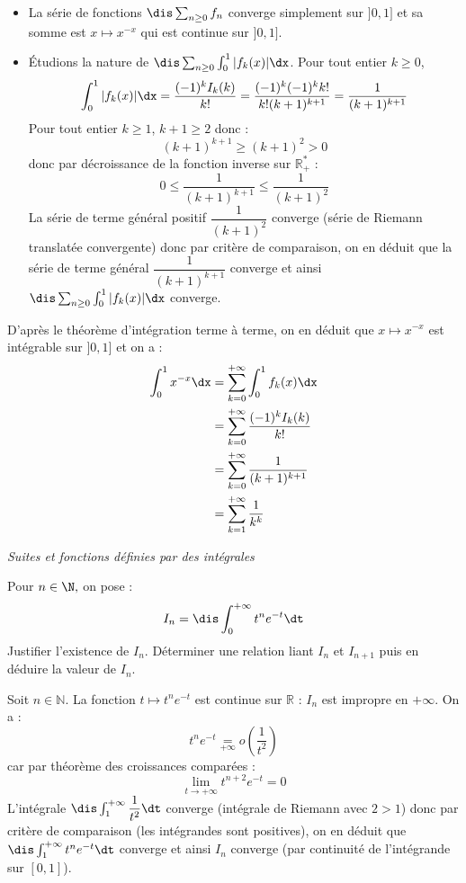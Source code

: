 \documentclass[a4paper,10pt]{report}
\begin{document}
\begin{enumerate}
\begin{itemize}
\item La série de fonctions $\dis \sum_{n \geq 0} f_n$ converge simplement sur $]0,1]$ et sa somme est $x \mapsto x^{-x}$ qui est continue sur $]0,1]$.
\item Étudions la nature de $\dis \sum_{n \geq 0} \int_0^1 \vert f_k(x) \vert\dx$. Pour tout entier $k \geq 0$,
$$ \int_0^1 \vert f_k(x) \vert\dx = \dfrac{(-1)^k I_k(k)}{k!} = \dfrac{(-1)^k(-1)^k k!}{k! (k+1)^{k+1}} = \dfrac{1}{(k+1)^{k+1}}$$
Pour tout entier $k \geq 1$, $k+1 \geq 2$ donc : 
$$ (k+1)^{k+1} \geq (k+1)^2 >0$$
donc par décroissance de la fonction inverse sur $\mathbb{R}_+^{*}$ :
$$ 0 \leq \dfrac{1}{(k+1)^{k+1}} \leq \dfrac{1}{(k+1)^2}$$
La série de terme général positif $\dfrac{1}{(k+1)^2}$ converge (série de Riemann translatée convergente) donc par critère de comparaison, on en déduit que la série de terme général $\dfrac{1}{(k+1)^{k+1}}$ converge et ainsi $\dis \sum_{n \geq 0} \int_0^1 \vert f_k(x) \vert\dx$ converge.
\end{itemize}
D'après le théorème d'intégration terme à terme, on en déduit que $x \mapsto x^{-x}$ est intégrable sur $]0,1]$ et on a :
\begin{align*}
\int_0^1 x^{-x} \dx & = \sum_{k=0}^{+ \infty} \int_0^1 f_k(x) \dx \\
& = \sum_{k=0}^{+ \infty} \dfrac{(-1)^k I_k(k)}{k!} \\
& = \sum_{k=0}^{+ \infty} \dfrac{1}{(k+1)^{k+1}} \\
& = \sum_{k=1}^{+ \infty} \dfrac{1}{k^k}
\end{align*}
\end{enumerate}


\medskip

\begin{center}
\textit{{ {\large Suites et fonctions définies par des intégrales}}}
\end{center}

\medskip

\begin{Exa} Pour $n\in\N,$ on pose :
$$I_n=\dis\int_0^{+\infty} t^ne^{-t} \dt$$
Justifier l'existence de $I_n$. D\'eterminer une relation liant $I_n$ et $I_{n+1}$ puis en d\'eduire la valeur de $I_n.$
\end{Exa} 

\corr Soit $n \in \mathbb{N}$. La fonction $t \mapsto  t^ne^{-t}$ est continue sur $\mathbb{R}$ : $I_n$ est impropre en $+ \infty$. On a :
$$ t^n e^{-t} \underset{ +\infty}{=} o \left( \dfrac{1}{t^2} \right)$$
car par théorème des croissances comparées :
$$ \lim_{t \rightarrow + \infty} t^{n+2} e^{-t}=0$$
L'intégrale $\dis \int_1^{+ \infty} \dfrac{1}{t^2} \dt$ converge (intégrale de Riemann avec $2>1$) donc par critère de comparaison (les intégrandes sont positives), on en déduit que $\dis \int_1^{+ \infty} t^n e^{-t} \dt$ converge et ainsi $I_n$ converge (par continuité de l'intégrande sur $[0,1]$).
\end{document}
